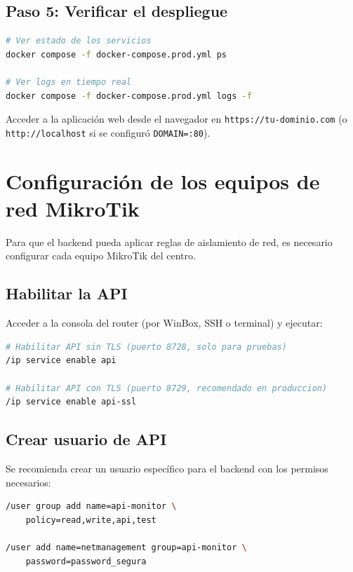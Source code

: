 \documentclass[12pt,a4paper]{article}
\begin{document}
\subsection{Paso 5: Verificar el despliegue}

\begin{lstlisting}[language=bash]
# Ver estado de los servicios
docker compose -f docker-compose.prod.yml ps

# Ver logs en tiempo real
docker compose -f docker-compose.prod.yml logs -f
\end{lstlisting}

Acceder a la aplicación web desde el navegador en \texttt{https://tu-dominio.com} (o \texttt{http://localhost} si se configuró \texttt{DOMAIN=:80}).

\section{Configuración de los equipos de red MikroTik}

Para que el backend pueda aplicar reglas de aislamiento de red, es necesario configurar cada equipo MikroTik del centro.

\subsection{Habilitar la API}

Acceder a la consola del router (por WinBox, SSH o terminal) y ejecutar:

\begin{lstlisting}[language=bash,title={RouterOS CLI}]
# Habilitar API sin TLS (puerto 8728, solo para pruebas)
/ip service enable api

# Habilitar API con TLS (puerto 8729, recomendado en produccion)
/ip service enable api-ssl
\end{lstlisting}

\subsection{Crear usuario de API}

Se recomienda crear un usuario específico para el backend con los permisos necesarios:

\begin{lstlisting}[language=bash,title={RouterOS CLI}]
/user group add name=api-monitor \
    policy=read,write,api,test

/user add name=netmanagement group=api-monitor \
    password=password_segura
\end{lstlisting}
\end{document}
